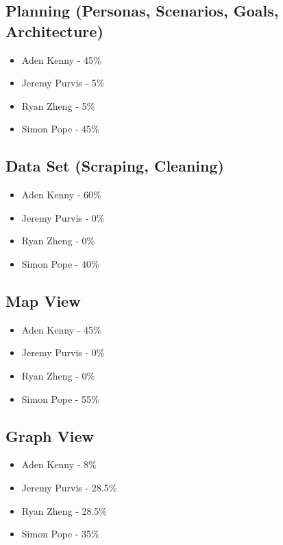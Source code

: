 \documentclass[10pt, journal]{IEEEtran}
\begin{document}
\subsection{Planning (Personas, Scenarios, Goals, Architecture)}
\begin{itemize}

\item{Aden Kenny - 45\%}
\item{Jeremy Purvis - 5\%}
\item{Ryan Zheng - 5\%}
\item{Simon Pope - 45\%}

\end{itemize}

\subsection{Data Set (Scraping, Cleaning)}
\begin{itemize}

\item{Aden Kenny - 60\%}
\item{Jeremy Purvis - 0\%}
\item{Ryan Zheng - 0\%}
\item{Simon Pope - 40\%}

\end{itemize}

\subsection{Map View}
\begin{itemize}

\item{Aden Kenny - 45\%}
\item{Jeremy Purvis - 0\%}
\item{Ryan Zheng - 0\%}
\item{Simon Pope - 55\%}

\end{itemize}

\subsection{Graph View}
\begin{itemize}

\item{Aden Kenny - 8\%}
\item{Jeremy Purvis - 28.5\%}
\item{Ryan Zheng - 28.5\%}
\item{Simon Pope - 35\%}

\end{itemize}
\end{document}
